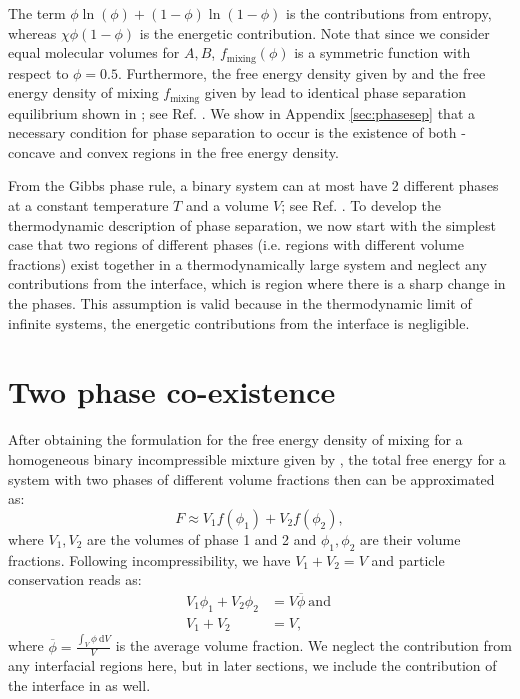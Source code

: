 The term $\phi \ln(\phi) + (1 - \phi) \ln (1 - \phi)$ is the contributions from entropy, whereas $\chi \phi (1 - \phi)$ is the energetic contribution.
Note that since we consider equal molecular volumes for $A,B$, $f_\mathrm{mixing} (\phi)$ is a symmetric function with respect to $\phi = 0.5$.
Furthermore, the free energy density given by  and the free energy density of mixing $f_\mathrm{mixing}$ given by  lead to identical phase separation equilibrium shown in ; see Ref. \cite{Review2019}.
We show in Appendix \ref{sec:phasesep} that a necessary condition for phase separation to occur is the existence of both - concave and convex regions in the free energy density.

From the Gibbs phase rule, a binary system can at most have 2 different phases at a constant temperature $T$ and a volume $V$; see Ref. \cite{Faghri2006}.
To develop the thermodynamic description of phase separation, we now start with the simplest case that two regions of different phases (i.e. regions with different volume fractions) exist together in a thermodynamically large system and neglect any contributions from the interface, which is region where there is a sharp change in the phases.
This assumption is valid because in the thermodynamic limit of infinite systems, the energetic contributions from the interface is negligible. 

\section{Two phase co-existence}

After obtaining the formulation for the free energy density of mixing for a homogeneous binary incompressible mixture given by , the total free energy for a system with two phases of different volume fractions then can be approximated as:
\begin{equation}
\label{eqn:free_energy_two_phase}
    F \approx V_1 f(\phi_1) + V_2 f(\phi_2),
\end{equation}
where $V_1, V_2$ are the volumes of phase 1 and 2 and $\phi_1, \phi_2$ are their volume fractions.
Following incompressibility, we have $V_1 + V_2 = V$ and particle conservation reads as:
\begin{subequations}\label{eqn:constraints}
\begin{align}
    V_1 \phi_1 + V_2 \phi_2 &= V \overline{\phi} \mathrm{~and~}
    \\[10pt]
    V_1 + V_2 &= V,
\end{align}
\end{subequations}
where $\overline{\phi} = \frac{\int_V \phi~\mathrm{d}V}{V}$ is the average volume fraction. 
We neglect the contribution from any interfacial regions here, but in later sections, we include the contribution of the interface in  as well. 

